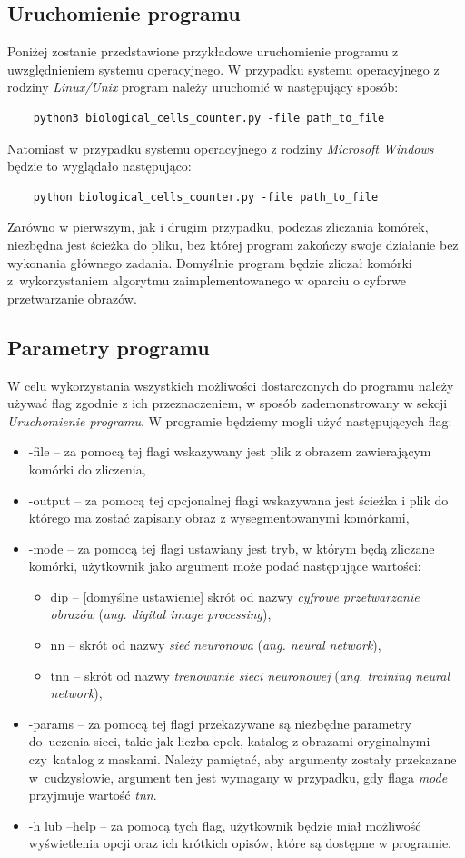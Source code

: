 \documentclass[a4paper]{article}
\begin{document}
\subsection{Uruchomienie programu}
Poniżej zostanie przedstawione przykładowe uruchomienie programu z uwzględnieniem systemu operacyjnego. W przypadku systemu operacyjnego z rodziny \textit{Linux/Unix} program należy uruchomić w następujący sposób:
\begin{verbatim}
    python3 biological_cells_counter.py -file path_to_file
\end{verbatim}
Natomiast w przypadku systemu operacyjnego z rodziny \textit{Microsoft Windows} będzie to wyglądało następująco:
\begin{verbatim}
    python biological_cells_counter.py -file path_to_file
\end{verbatim}
Zarówno w pierwszym, jak i drugim przypadku, podczas zliczania komórek, niezbędna jest ścieżka do pliku, bez której program zakończy swoje działanie bez wykonania głównego zadania. Domyślnie program będzie zliczał komórki z~wykorzystaniem algorytmu zaimplementowanego w oparciu o cyforwe przetwarzanie obrazów.
\subsection{Parametry programu}
W celu wykorzystania wszystkich możliwości dostarczonych do programu należy używać flag zgodnie z ich przeznaczeniem, w sposób zademonstrowany w sekcji \textit{Uruchomienie programu}. W programie będziemy mogli użyć następujących flag:
\begin{itemize}
    \item -file -- za pomocą tej flagi wskazywany jest plik z obrazem zawierającym komórki do zliczenia,
    \item -output -- za pomocą tej opcjonalnej flagi wskazywana jest ścieżka i plik do którego ma zostać zapisany obraz z wysegmentowanymi komórkami,
    \item -mode -- za pomocą tej flagi ustawiany jest tryb, w którym będą zliczane komórki, użytkownik jako argument może podać następujące wartości:
    \begin{itemize}
        \item dip -- [domyślne ustawienie] skrót od nazwy \textit{cyfrowe przetwarzanie obrazów} (\textit{ang. digital image processing}),
        \item nn -- skrót od nazwy \textit{sieć neuronowa} (\textit{ang. neural network}),
        \item tnn -- skrót od nazwy \textit{trenowanie sieci neuronowej} (\textit{ang. training neural network}),
    \end{itemize}
    \item -params -- za pomocą tej flagi przekazywane są niezbędne parametry do~uczenia sieci, takie jak liczba epok, katalog z obrazami oryginalnymi czy~katalog z maskami. Należy pamiętać, aby argumenty zostały przekazane w~cudzysłowie, argument ten jest wymagany w przypadku, gdy flaga \textit{mode} przyjmuje wartość \textit{tnn}.
    \item -h lub --help -- za pomocą tych flag, użytkownik będzie miał możliwość wyświetlenia opcji oraz ich krótkich opisów, które są dostępne w programie.
\end{itemize}
\end{document}
